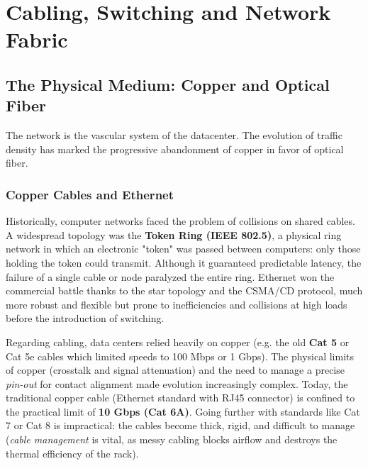\chapter{Cabling, Switching and Network Fabric}

\section{The Physical Medium: Copper and Optical Fiber}
The network is the vascular system of the datacenter. The evolution of traffic density has marked the progressive abandonment of copper in favor of optical fiber.

\subsection{Copper Cables and Ethernet}
Historically, computer networks faced the problem of collisions on shared cables. A widespread topology was the \textbf{Token Ring (IEEE 802.5)}, a physical ring network in which an electronic "token" was passed between computers: only those holding the token could transmit. Although it guaranteed predictable latency, the failure of a single cable or node paralyzed the entire ring. Ethernet won the commercial battle thanks to the star topology and the CSMA/CD protocol, much more robust and flexible but prone to inefficiencies and collisions at high loads before the introduction of switching.

Regarding cabling, data centers relied heavily on copper (e.g. the old \textbf{Cat 5} or Cat 5e cables which limited speeds to 100 Mbps or 1 Gbps). The physical limits of copper (crosstalk and signal attenuation) and the need to manage a precise \textit{pin-out} for contact alignment made evolution increasingly complex. 
Today, the traditional copper cable (Ethernet standard with RJ45 connector) is confined to the practical limit of \textbf{10 Gbps (Cat 6A)}. Going further with standards like Cat 7 or Cat 8 is impractical: the cables become thick, rigid, and difficult to manage (\textit{cable management} is vital, as messy cabling blocks airflow and destroys the thermal efficiency of the rack).

